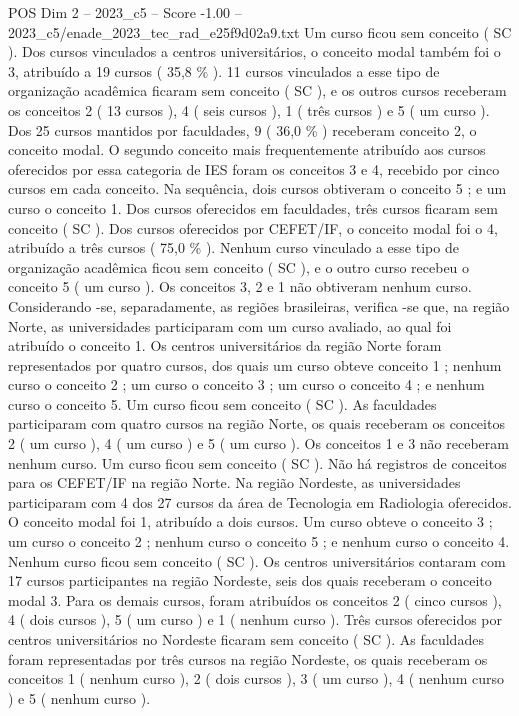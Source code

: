 \begin{textsample}{POS Dim 2 – 2023\_c5 – Score -1.00 – 2023\_c5/enade\_2023\_tec\_rad\_e25f9d02a9.txt}
Um curso ficou sem conceito ( SC ).
Dos cursos vinculados a centros universitários, o conceito modal também foi o 3, atribuído a 19 cursos ( 35,8 \% ). 11 cursos vinculados a esse tipo de organização acadêmica ficaram sem conceito ( SC ), e os outros cursos receberam os conceitos 2 ( 13 cursos ), 4 ( seis cursos ), 1 ( três cursos ) e 5 ( um curso ).
Dos 25 cursos mantidos por faculdades, 9 ( 36,0 \% ) receberam conceito 2, o conceito modal.
O segundo conceito mais frequentemente atribuído aos cursos oferecidos por essa categoria de IES foram os conceitos 3 e 4, recebido por cinco cursos em cada conceito.
Na sequência, dois cursos obtiveram o conceito 5 ; e um curso o conceito 1.
Dos cursos oferecidos em faculdades, três cursos ficaram sem conceito ( SC ).
Dos cursos oferecidos por CEFET/IF, o conceito modal foi o 4, atribuído a três cursos ( 75,0 \% ).
Nenhum curso vinculado a esse tipo de organização acadêmica ficou sem conceito ( SC ), e o outro curso recebeu o conceito 5 ( um curso ).
Os conceitos 3, 2 e 1 não obtiveram nenhum curso.
Considerando -se, separadamente, as regiões brasileiras, verifica -se que, na região Norte, as universidades participaram com um curso avaliado, ao qual foi atribuído o conceito 1.
Os centros universitários da região Norte foram representados por quatro cursos, dos quais um curso obteve conceito 1 ; nenhum curso o conceito 2 ; um curso o conceito 3 ; um curso o conceito 4 ; e nenhum curso o conceito 5.
Um curso ficou sem conceito ( SC ).
As faculdades participaram com quatro cursos na região Norte, os quais receberam os conceitos 2 ( um curso ), 4 ( um curso ) e 5 ( um curso ).
Os conceitos 1 e 3 não receberam nenhum curso.
Um curso ficou sem conceito ( SC ).
Não há registros de conceitos para os CEFET/IF na região Norte.
Na região Nordeste, as universidades participaram com 4 dos 27 cursos da área de Tecnologia em Radiologia oferecidos.
O conceito modal foi 1, atribuído a dois cursos.
Um curso obteve o conceito 3 ; um curso o conceito 2 ; nenhum curso o conceito 5 ; e nenhum curso o conceito 4.
Nenhum curso ficou sem conceito ( SC ).
Os centros universitários contaram com 17 cursos participantes na região Nordeste, seis dos quais receberam o conceito modal 3.
Para os demais cursos, foram atribuídos os conceitos 2 ( cinco cursos ), 4 ( dois cursos ), 5 ( um curso ) e 1 ( nenhum curso ).
Três cursos oferecidos por centros universitários no Nordeste ficaram sem conceito ( SC ).
As faculdades foram representadas por três cursos na região Nordeste, os quais receberam os conceitos 1 ( nenhum curso ), 2 ( dois cursos ), 3 ( um curso ), 4 ( nenhum curso ) e 5 ( nenhum curso ).

\end{textsample}
